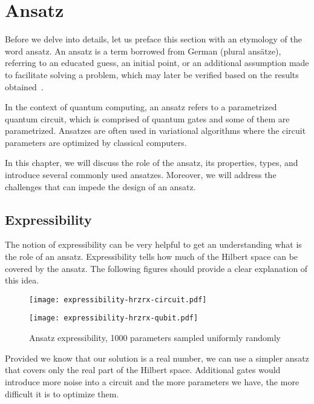 \chapter{Ansatz}\label{ch:ansatz}
Before we delve into details, let us preface this section with an etymology of the word ansatz. An ansatz is a term borrowed from German (plural ansätze), referring to an educated guess, an initial point, or an additional assumption made to facilitate solving a problem, which may later be verified based on the results obtained~\cite{ansatz_etymology}.

In the context of quantum computing, an ansatz refers to a parametrized quantum circuit, which is comprised of quantum gates and some of them are parametrized. Ansatzes are often used in variational algorithms where the circuit parameters are optimized by classical computers.

In this chapter, we will discuss the role of the ansatz, its properties, types, and introduce several commonly used ansatzes. Moreover, we will address the challenges that can impede the design of an ansatz.

\section{Expressibility}
The notion of expressibility can be very helpful to get an understanding what is the role of an ansatz. Expressibility tells how much of the Hilbert space can be covered by the ansatz. The following figures should provide a clear explanation of this idea.

\begin{figure}[H]
        \centering
        \begin{minipage}{0.4\linewidth}
            \centering
            \texttt{[image: expressibility-hrzrx-circuit.pdf]}
        \end{minipage}
        \begin{minipage}{0.4\linewidth}
            \centering
            \texttt{[image: expressibility-hrzrx-qubit.pdf]}
        \end{minipage}
        \caption{Ansatz expressibility, 1000 parameters sampled uniformly randomly}
\end{figure}

Provided we know that our solution is a real number, we can use a simpler ansatz that covers only the real part of the Hilbert space. Additional gates would introduce more noise into a circuit and the more parameters we have, the more difficult it is to optimize them.

